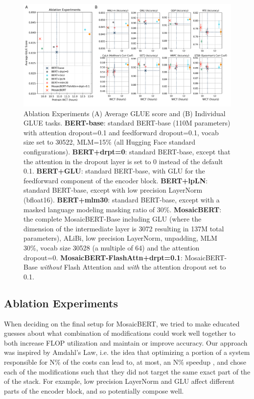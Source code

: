 \documentclass{article}
\begin{document}
\begin{figure}
    \centering
    \includegraphics[width=1\textwidth]{figures/ablation-experiments-v2.png}
    \caption{Ablation Experiments (A) Average GLUE score and (B) Individual GLUE tasks. \textbf{BERT-base}: standard BERT-base (110M parameters) with attention dropout=0.1 and feedforward dropout=0.1, vocab size set to 30522, MLM=15\% (all Hugging Face standard configurations). \textbf{BERT+drpt=0}: standard BERT-base, except that the attention in the dropout layer is set to 0 instead of the default 0.1. \textbf{BERT+GLU}: standard BERT-base, with GLU for the feedforward component of the encoder block. \textbf{BERT+lpLN}: standard BERT-base, except with low precision LayerNorm (bfloat16). \textbf{BERT+mlm30}: standard BERT-base, except with a masked language modeling masking ratio of 30\%. \textbf{MosaicBERT}: the complete MosaicBERT-Base including GLU (where the dimension of the intermediate layer is 3072 resulting in 137M total parameters), ALiBi, low precision LayerNorm, unpadding, MLM 30\%, vocab size 30528 (a multiple of 64) and the attention dropout=0. \textbf{MosaicBERT-FlashAttn+drpt=0.1}: MosaicBERT-Base \textit{without} Flash Attention and \textit{with} the attention dropout set to 0.1.}
    \label{fig:ablation_experiments}
\end{figure}

\subsection{Ablation Experiments}

When deciding on the final setup for MosaicBERT, we tried to make educated guesses about what combination of modifications could work well together to both increase FLOP utilization and maintain or improve accuracy. Our approach was inspired by Amdahl's Law, i.e. the idea that optimizing a portion of a system responsible for N\% of the costs can lead to, at most, an N\% speedup \citep{rodgers1985improvements}, and chose each of the modifications such that they did not target the same exact part of the of the stack. For example, low precision LayerNorm and GLU affect different parts of the encoder block, and so potentially compose well.
\end{document}
